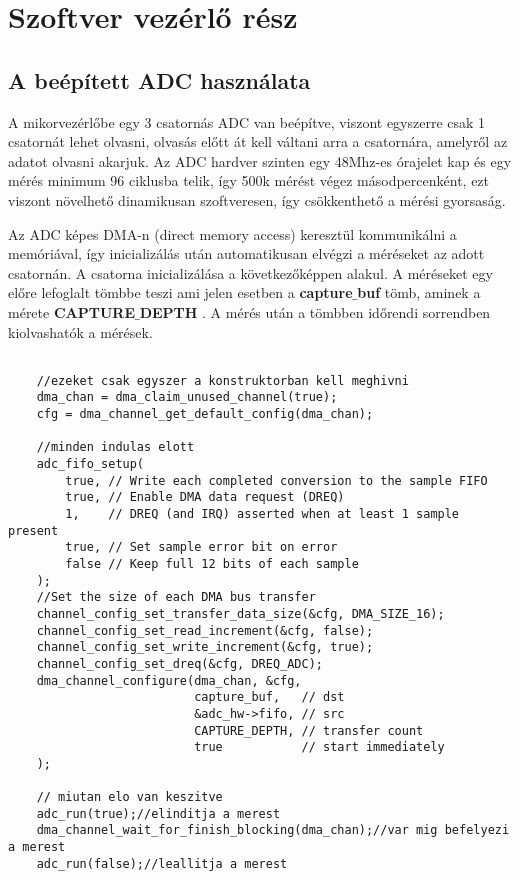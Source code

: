 \section{Szoftver vezérlő rész}

\subsection{A beépített ADC használata}

A mikorvezérlőbe egy 3 csatornás ADC van beépítve, viszont egyszerre csak 1 
csatornát lehet olvasni, olvasás előtt át kell váltani arra a csatornára, amelyről
az adatot olvasni akarjuk. Az ADC hardver szinten egy 48Mhz-es órajelet kap és
egy mérés minimum 96 ciklusba telik, így 500k mérést végez másodpercenként, 
ezt viszont növelhető dinamikusan szoftveresen, így csökkenthető a mérési gyorsaság.


Az ADC képes DMA-n (direct memory access) \cite{DMA} keresztül kommunikálni a 
memóriával, így inicializálás után automatikusan elvégzi a méréseket az adott
csatornán. A csatorna inicializálása a következőképpen alakul. A méréseket
egy előre lefoglalt tömbbe teszi ami jelen esetben a \textbf{capture$\_$buf} tömb,
aminek a mérete \textbf{CAPTURE$\_$DEPTH} . A mérés után a tömbben időrendi sorrendben
kiolvashatók a mérések.


\begin{lstlisting}

    //ezeket csak egyszer a konstruktorban kell meghivni
    dma_chan = dma_claim_unused_channel(true);
    cfg = dma_channel_get_default_config(dma_chan);

    //minden indulas elott
    adc_fifo_setup(
        true, // Write each completed conversion to the sample FIFO
        true, // Enable DMA data request (DREQ)
        1,    // DREQ (and IRQ) asserted when at least 1 sample present
        true, // Set sample error bit on error
        false // Keep full 12 bits of each sample
    );
    //Set the size of each DMA bus transfer
    channel_config_set_transfer_data_size(&cfg, DMA_SIZE_16);
    channel_config_set_read_increment(&cfg, false);
    channel_config_set_write_increment(&cfg, true);
    channel_config_set_dreq(&cfg, DREQ_ADC);
    dma_channel_configure(dma_chan, &cfg,
                          capture_buf,   // dst
                          &adc_hw->fifo, // src
                          CAPTURE_DEPTH, // transfer count
                          true           // start immediately
    );

    // miutan elo van keszitve
    adc_run(true);//elinditja a merest
    dma_channel_wait_for_finish_blocking(dma_chan);//var mig befelyezi a merest
    adc_run(false);//leallitja a merest

\end{lstlisting}

